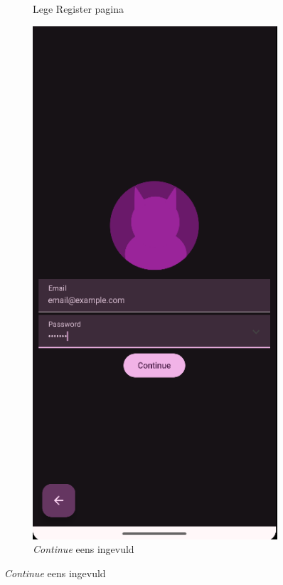 \documentclass{report}
\begin{document}
\begin{figure}[h]
\begin{subfigure}[b]{0.32\textwidth}
        \caption{Lege Register pagina}
    \end{subfigure}
    \hfill
    \begin{subfigure}[b]{0.32\textwidth}
        \includegraphics[width=\textwidth]{DEMO_Reg2.png} 
        \caption{\textit{Continue} eens ingevuld}
    \end{subfigure}


\end{figure}
\end{document}

